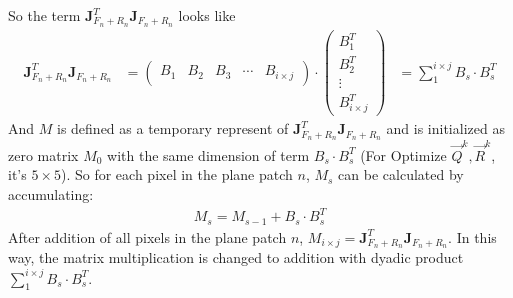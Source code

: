 So the term $\mathbf{J}_{F_n+R_n}^{T} \mathbf{J}_{F_n+R_n} $ looks like 
\begin{align}
	\mathbf{J}_{F_n+R_n}^{T} \mathbf{J}_{F_n+R_n} &= \begin{pmatrix} B_1 & B_2 & B_3& \cdots & B_{i \times j} \end{pmatrix} \cdot \begin{pmatrix}
		B_1^T\\
		B_2^T\\
		\vdots\\
		B_{i\times j}^T
	\end{pmatrix}
	& = \sum_{1}^{i \times j} B_{s} \cdot B_{s}^T
\end{align}
And $M$ is defined as a temporary represent of $\mathbf{J}_{F_n+R_n}^{T} \mathbf{J}_{F_n+R_n}$  and is initialized as zero matrix $M_0$ with the same dimension of term $B_{s} \cdot B_{s}^T$ (For Optimize $\vec{Q}^k, \vec{R}^k$, it's $5 \times 5$). So for each pixel in the plane patch $n$, $M_s$ can be calculated by accumulating:
\begin{align}
 M_s = M_{s-1} + B_{s} \cdot B_{s}^T
\end{align}
After addition of all pixels in the plane patch $n$, $M_{i \times j} = \mathbf{J}_{F_n+R_n}^{T} \mathbf{J}_{F_n+R_n}$. In this way, the matrix multiplication is changed to addition with dyadic product $ \sum_{1}^{i \times j} B_{s} \cdot B_{s}^T $.

